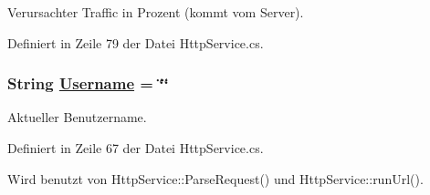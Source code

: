 Verursachter Traffic in Prozent (kommt vom Server). 



Definiert in Zeile 79 der Datei Http\-Service.cs.\hypertarget{classQbeSAS_1_1HttpService_1_1ServiceDataType_QbeSAS_1_1HttpService_1_1ServiceDataTypeo0}{
\subsubsection[Username]{\setlength{\rightskip}{0pt plus 5cm}String \hyperlink{classQbeSAS_1_1HttpService_1_1ServiceDataType_QbeSAS_1_1HttpService_1_1ServiceDataTypeo0}{Username} = \char`\"{}\char`\"{}}}
\label{classQbeSAS_1_1HttpService_1_1ServiceDataType_QbeSAS_1_1HttpService_1_1ServiceDataTypeo0}


Aktueller Benutzername. 



Definiert in Zeile 67 der Datei Http\-Service.cs.

Wird benutzt von Http\-Service::Parse\-Request() und Http\-Service::run\-Url().